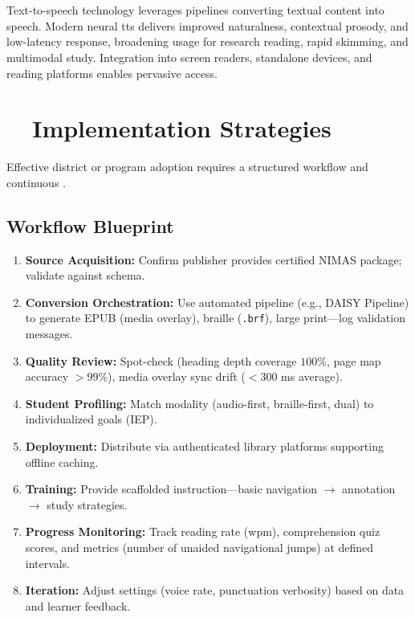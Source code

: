 \section{~~}\label{ch07:sec:tts}
Text-to-speech technology leverages  pipelines converting textual
content into speech.\supercite{VisionAid2025} Modern neural \gls{tts} delivers improved naturalness,
contextual prosody, and low-latency response, broadening usage for research reading, rapid skimming,
and multimodal study. Integration into screen readers, standalone devices, and reading platforms
enables pervasive access.

\section{~~Implementation Strategies}\label{ch07:sec:implementation-strategies}
Effective district or program adoption requires a structured workflow and continuous .

\subsection{Workflow Blueprint}
\begin{enumerate}
	\item \textbf{Source Acquisition:} Confirm publisher provides certified NIMAS package; validate against schema.
	\item \textbf{Conversion Orchestration:} Use automated pipeline (e.g., DAISY Pipeline) to generate EPUB (media overlay),
	      braille (\texttt{.brf}), large print—log validation messages.
	\item \textbf{Quality Review:} Spot-check  (heading depth coverage $100\%$, page map accuracy $> 99\%$),
	      media overlay sync drift ($< 300$ ms average).
	\item \textbf{Student Profiling:} Match modality (audio-first, braille-first, dual) to individualized goals (IEP).
	\item \textbf{Deployment:} Distribute via authenticated library platforms supporting offline caching.
	\item \textbf{Training:} Provide scaffolded instruction—basic navigation $\rightarrow$ annotation $\rightarrow$ study strategies.
	\item \textbf{Progress Monitoring:} Track reading rate (wpm), comprehension quiz scores, and  metrics
	      (number of unaided navigational jumps) at defined intervals.
	\item \textbf{Iteration:} Adjust settings (voice rate, punctuation verbosity) based on data and learner feedback.
\end{enumerate}

